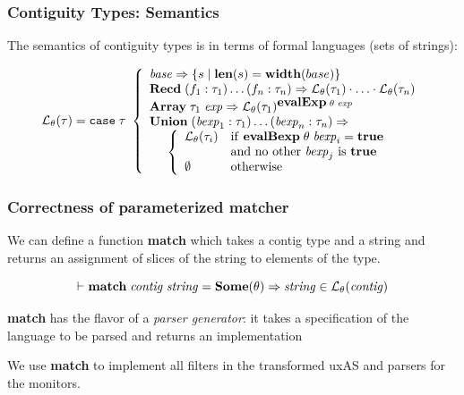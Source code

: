\documentclass{beamer}
\newcommand{\imp}{\Rightarrow}
\newcommand{\konst}[1]{\ensuremath{\mbox{\bf{#1}}}}
\newcommand{\set}[1]{\{ {#1} \}}
\newcommand{\LangTheta}[1]{\ensuremath{{\mathcal L}_{\theta}({#1})}}
\begin{document}
\begin{frame}[fragile]\frametitle{Contiguity Types: Semantics}

The semantics of contiguity types is in terms of formal languages
(sets of strings):

\[
\LangTheta{\tau} =
\mathtt{case}\; \tau\
 \left\{
 \begin{array}{l}
 \mathit{base} \Rightarrow \set{s \mid \konst{len}(s) = \konst{width}(base)} \\
 \konst{Recd}\; (f_1 : \tau_1) \ldots (f_n : \tau_n)
      \Rightarrow \LangTheta{\tau_1} \cdot \ldots \cdot \LangTheta{\tau_n}
\\
 \konst{Array}\; \tau_1 \; \mathit{exp}
      \Rightarrow  \LangTheta{\tau_1}^{\konst{evalExp}\;\theta\;\mathit{exp}}
\\
 \konst{Union}\; (\mathit{bexp}_1 : \tau_1) \ldots (\mathit{bexp}_n : \tau_n) \Rightarrow \\
  \hspace*{5mm}
 \left\{
 \begin{array}{ll}
    \LangTheta{\tau_i} &  \mathrm{if}\ \konst{evalBexp}\;\theta\;\mathit{bexp}_i = \konst{true} \\
                  & \mathrm{and\ no\ other}\ \mathit{bexp}_j\ \mathrm{is}\ \konst{true}  \\
    \emptyset & \mathrm{otherwise}
 \end{array}
 \right.
 \\
\end{array}
 \right.
\]
\end{frame}

\begin{frame}[fragile]\frametitle{Correctness of parameterized matcher}

We can define a function \textbf{match} which takes a contig type and
a string and returns an assignment of slices of the string to elements of the type.

\begin{theorem}[Correctness]
  \[
 \vdash \konst{match}\; \mathit{contig}\; \mathit{string} = \konst{Some}(\theta) \imp
   \mathit{string} \in \LangTheta{\mathit{contig}}
\]
\end{theorem}

\textbf{match} has the flavor of a \emph{parser generator}: it takes a
specification of the language to be parsed and returns an implementation

We use \textbf{match} to implement all filters in the transformed uxAS
and parsers for the monitors.

\end{frame}
\end{document}
